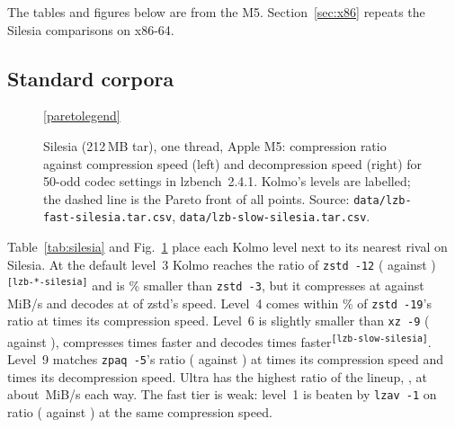 \documentclass[conference]{IEEEtran}
\newcommand{\src}[1]{\textsuperscript{\tiny\color{gray}\texttt{[#1]}}}
\newcommand{\todoin}[1]{{\color{red}\footnotesize[TODO: #1]}}
\newcommand{\src}[1]{}
\newcommand{\todoin}[1]{}
\begin{document}
The tables and figures below are from the M5. Section~\ref{sec:x86} repeats the Silesia comparisons on x86-64.

\subsection{Standard corpora}

\begin{figure}[t]
\centering

\ref{paretolegend}
\caption{Silesia (212\,MB tar), one thread, Apple M5: compression ratio against compression speed (left) and
decompression speed (right) for 50-odd codec settings in lzbench~2.4.1. Kolmo's levels are labelled; the dashed line
is the Pareto front of all points. Source: \texttt{data/lzb-fast-silesia.tar.csv},
\texttt{data/lzb-slow-silesia.tar.csv}.}\label{fig:pareto}
\end{figure}

\begin{table}[t]
\caption{Silesia, one thread, lzbench 2.4.1, Apple M5. C and D: compression and decompression speed in MiB/s.
Source: \texttt{data/lzb-\{fast,slow\}-silesia.tar.csv}. \todoin{tuned levels}}\label{tab:silesia}
\centering\scriptsize\setlength{\tabcolsep}{3.2pt}

\end{table}

Table~\ref{tab:silesia} and Fig.~\ref{fig:pareto} place each Kolmo level next to its nearest rival on Silesia. At
the default level~3 Kolmo reaches the ratio of \texttt{zstd -12} (\numSilKThreeR{} against
\numSilzstdOneTwoR{})\src{lzb-*-silesia} and is \numSilThreeVsZstdPct\% smaller than \texttt{zstd -3}, but it
compresses at \numSilKThreeC{} against \numSilzstdThreeC{}\,MiB/s and decodes at \numSilThreeDecFrac{} of zstd's
speed. Level~4 comes within \numSilFourVsZnineteenPct\% of \texttt{zstd -19}'s ratio at
\numSilFourVsZnineteenEnc{} times its compression speed. Level~6 is slightly smaller than \texttt{xz -9}
(\numSilKSixR{} against \numSilxzNineR{}), compresses \numSilSixVsXzEnc{} times faster and decodes
\numSilSixVsXzDec{} times faster\src{lzb-slow-silesia}. Level~9 matches \texttt{zpaq -5}'s ratio
(\numSilKNineR{} against \numSilzpaqFiveR{}) at \numSilNineVsZpaqEnc{} times its compression speed and
\numSilNineVsZpaqDec{} times its decompression speed. Ultra has the highest ratio of the lineup, \numSilKOneZeroR,
at about \numSilKOneZeroC\,MiB/s each way. The fast tier is weak: level~1 is beaten by \texttt{lzav -1} on ratio
(\numSilKOneR{} against \numSillzavOneR) at the same compression speed.
\end{document}
